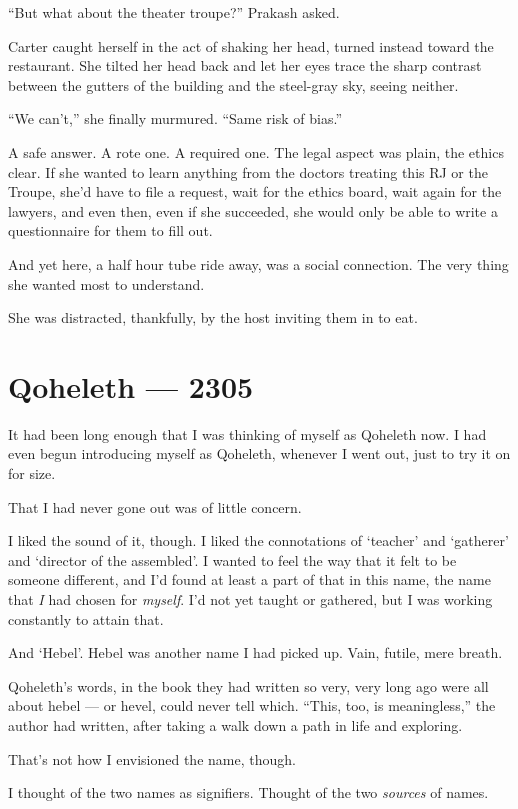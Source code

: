 ``But what about the theater troupe?'' Prakash asked.

Carter caught herself in the act of shaking her head, turned instead toward the restaurant. She tilted her head back and let her eyes trace the sharp contrast between the gutters of the building and the steel-gray sky, seeing neither.

``We can't,'' she finally murmured. ``Same risk of bias.''

A safe answer. A rote one. A required one. The legal aspect was plain, the ethics clear. If she wanted to learn anything from the doctors treating this RJ or the Troupe, she'd have to file a request, wait for the ethics board, wait again for the lawyers, and even then, even if she succeeded, she would only be able to write a questionnaire for them to fill out.

And yet here, a half hour tube ride away, was a social connection. The very thing she wanted most to understand.

She was distracted, thankfully, by the host inviting them in to eat.

\chapter*{Qoheleth — 2305}

\noindent It had been long enough that I was thinking of myself as Qoheleth now. I had even begun introducing myself as Qoheleth, whenever I went out, just to try it on for size.

That I had never gone out was of little concern.

I liked the sound of it, though. I liked the connotations of `teacher' and `gatherer' and `director of the assembled'. I wanted to feel the way that it felt to be someone different, and I'd found at least a part of that in this name, the name that \emph{I} had chosen for \emph{myself}. I'd not yet taught or gathered, but I was working constantly to attain that.

And `Hebel'. Hebel was another name I had picked up. Vain, futile, mere breath.

Qoheleth's words, in the book they had written so very, very long ago were all about hebel --- or hevel, could never tell which. ``This, too, is meaningless,'' the author had written, after taking a walk down a path in life and exploring.

That's not how I envisioned the name, though.

I thought of the two names as signifiers. Thought of the two \emph{sources} of names.

